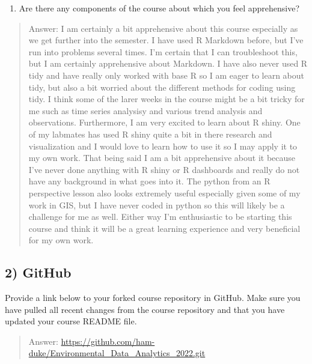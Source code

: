 \documentclass[
]{article}
\providecommand{\tightlist}{%
  \setlength{\itemsep}{0pt}\setlength{\parskip}{0pt}}
\begin{document}
\begin{enumerate}
\def\labelenumi{\arabic{enumi}.}
\setcounter{enumi}{2}
\tightlist
\item
  Are there any components of the course about which you feel
  apprehensive?
\end{enumerate}

\begin{quote}
Answer: I am certainly a bit apprehensive about this course especially
as we get further into the semester. I have used R Markdown before, but
I've run into problems several times. I'm certain that I can
troubleshoot this, but I am certainly apprehensive about Markdown. I
have also never used R tidy and have really only worked with base R so I
am eager to learn about tidy, but also a bit worried about the different
methods for coding using tidy. I think some of the larer weeks in the
course might be a bit tricky for me such as time series analysisy and
various trend analysis and observations. Furthermore, I am very excited
to learn about R shiny. One of my labmates has used R shiny quite a bit
in there research and visualization and I would love to learn how to use
it so I may apply it to my own work. That being said I am a bit
apprehensive about it because I've never done anything with R shiny or R
dashboards and really do not have any background in what goes into it.
The python from an R perspective lesson also looks extremely useful
especially given some of my work in GIS, but I have never coded in
python so this will likely be a challenge for me as well. Either way I'm
enthusiastic to be starting this course and think it will be a great
learning experience and very beneficial for my own work.
\end{quote}

\hypertarget{github}{%
\subsection{2) GitHub}\label{github}}

Provide a link below to your forked course repository in GitHub. Make
sure you have pulled all recent changes from the course repository and
that you have updated your course README file.

\begin{quote}
Answer:
\url{https://github.com/ham-duke/Environmental_Data_Analytics_2022.git}
\end{quote}
\end{document}
